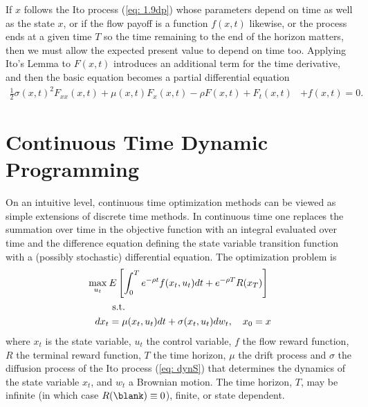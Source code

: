 \documentclass[\topdir/lecture\_notes.tex]{subfiles}
\begin{document}
If $x$ follows the Ito process (\ref{eq: 1.9dp}) whose parameters depend on time as well as the state $x$, or if the flow payoff is a function $f(x, t)$ likewise, or the process ends at a given time $T$ so the time remaining to the end of the horizon matters, then we must allow the expected present value to depend on time too. Applying Ito's Lemma to $F(x, t)$ introduces an additional term for the time derivative, and then the basic equation becomes a partial differential equation
\begin{align}
\frac{1}{2} \sigma(x, t)^{2} F_{x x}(x, t) +\mu(x, t) F_{x}(x, t)-\rho F(x, t)+F_{t}(x, t)
& +f(x, t)=0. \label{eq:pdv}
\end{align}

\section{Continuous Time Dynamic Programming}
On an intuitive level, continuous time optimization methods can be viewed as simple extensions of discrete time methods. In continuous time one replaces the summation over time in the objective function with an integral evaluated over time and the difference equation defining the state variable transition function with a (possibly stochastic) differential equation. The optimization problem is
\begin{align}
\max_{u_t}\: & E\left[\int_{0}^{T} e^{-\rho t} f(x_t, u_t) dt+e^{-\rho T} R(x_T) \right]\label{eq: obj}\\
& \text{ s.t. } \notag \\
dx_t &= \mu(x_t, u_t) dt+ \sigma(x_t,u_t) dw_t, \quad x_0=x \label{eq: dynS}
\end{align}
where $x_t$ is the state variable, $u_t$ the control variable, $f$ the flow reward function, $R$ the terminal reward function, $T$ the time horizon, $\mu$ the drift process and $\sigma$ the diffusion process of the Ito process (\ref{eq: dynS}) that determines the dynamics of the state variable $x_t$, and $w_t$ a Brownian motion. The time horizon, $T$, may be infinite (in which case $R(\blank) \equiv 0$), finite, or state dependent.
\end{document}
